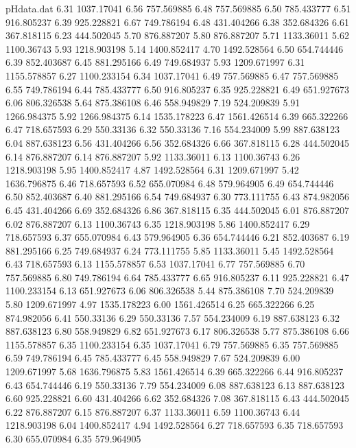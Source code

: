 \begin{filecontents}{pHdata.dat}
6.31 	1037.17041
6.56 	757.569885
6.48 	757.569885
6.50 	785.433777
6.51 	916.805237
6.39 	925.228821
6.67 	749.786194
6.48 	431.404266
6.38 	352.684326
6.61 	367.818115
6.23 	444.502045
5.70 	876.887207
5.80 	876.887207
5.71 	1133.36011
5.62 	1100.36743
5.93 	1218.903198
5.14 	1400.852417
4.70 	1492.528564
6.50 	654.744446
6.39 	852.403687
6.45 	881.295166
6.49 	749.684937
5.93 	1209.671997
6.31 	1155.578857
6.27 	1100.233154
6.34 	1037.17041
6.49 	757.569885
6.47 	757.569885
6.55 	749.786194
6.44 	785.433777
6.50 	916.805237
6.35 	925.228821
6.49 	651.927673
6.06 	806.326538
5.64 	875.386108
6.46 	558.949829
7.19 	524.209839
5.91 	1266.984375
5.92 	1266.984375
6.14 	1535.178223
6.47 	1561.426514
6.39 	665.322266
6.47 	718.657593
6.29 	550.33136
6.32 	550.33136
7.16 	554.234009
5.99 	887.638123
6.04 	887.638123
6.56 	431.404266
6.56 	352.684326
6.66 	367.818115
6.28 	444.502045
6.14 	876.887207
6.14 	876.887207
5.92 	1133.36011
6.13 	1100.36743
6.26 	1218.903198
5.95 	1400.852417
4.87 	1492.528564
6.31 	1209.671997
5.42 	1636.796875
6.46 	718.657593
6.52 	655.070984
6.48 	579.964905
6.49 	654.744446
6.50 	852.403687
6.40 	881.295166
6.54 	749.684937
6.30 	773.111755
6.43 	874.982056
6.45 	431.404266
6.69 	352.684326
6.86 	367.818115
6.35 	444.502045
6.01 	876.887207
6.02 	876.887207
6.13 	1100.36743
6.35 	1218.903198
5.86 	1400.852417
6.29 	718.657593
6.37 	655.070984
6.43 	579.964905
6.36 	654.744446
6.21 	852.403687
6.19 	881.295166
6.25 	749.684937
6.24 	773.111755
5.85 	1133.36011
5.45 	1492.528564
6.43 	718.657593
6.13 	1155.578857
6.53 	1037.17041
6.77 	757.569885
6.70 	757.569885
6.80 	749.786194
6.64 	785.433777
6.65 	916.805237
6.11 	925.228821
6.47 	1100.233154
6.13 	651.927673
6.06 	806.326538
5.44 	875.386108
7.70 	524.209839
5.80 	1209.671997
4.97 	1535.178223
6.00 	1561.426514
6.25 	665.322266
6.25 	874.982056
6.41 	550.33136
6.29 	550.33136
7.57 	554.234009
6.19 	887.638123
6.32 	887.638123
6.80 	558.949829
6.82 	651.927673
6.17 	806.326538
5.77 	875.386108
6.66 	1155.578857
6.35 	1100.233154
6.35 	1037.17041
6.79 	757.569885
6.35 	757.569885
6.59 	749.786194
6.45 	785.433777
6.45 	558.949829
7.67 	524.209839
6.00 	1209.671997
5.68 	1636.796875
5.83 	1561.426514
6.39 	665.322266
6.44 	916.805237
6.43 	654.744446
6.19 	550.33136
7.79 	554.234009
6.08 	887.638123
6.13 	887.638123
6.60 	925.228821
6.60 	431.404266
6.62 	352.684326
7.08 	367.818115
6.43 	444.502045
6.22 	876.887207
6.15 	876.887207
6.37 	1133.36011
6.59 	1100.36743
6.44 	1218.903198
6.04 	1400.852417
4.94 	1492.528564
6.27 	718.657593
6.35 	718.657593
6.30 	655.070984
6.35 	579.964905

\end{filecontents}
